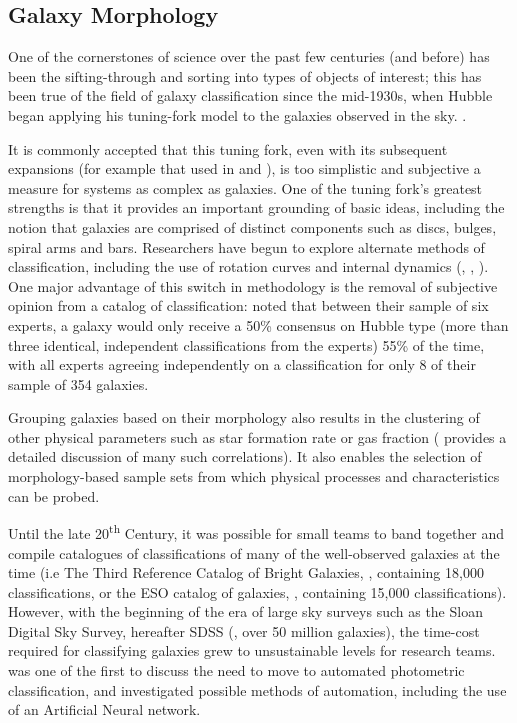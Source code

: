 \documentclass[../main.tex]{subfiles}
\begin{document}
\subsection{Galaxy Morphology}
\label{subsec:galaxy-morphology}
One of the cornerstones of science over the past few centuries (and before) has been the sifting-through and sorting into types of objects of interest; this has been true of the field of galaxy classification since the mid-1930s, when Hubble began applying his tuning-fork model to the galaxies observed in the sky. \citep{Hubble1936}.

It is commonly accepted that this tuning fork, even with its subsequent expansions (for example that used in \citealt{Sandage1961} and \citealt{deVaucouleurs1991}), is too simplistic and subjective a measure for systems as complex as galaxies. One of the tuning fork's greatest strengths is that it provides an important grounding of basic ideas, including the notion that galaxies are comprised of distinct components such as discs, bulges, spiral arms and bars. Researchers have begun to explore alternate methods of classification, including the use of rotation curves and internal dynamics (\citealt{2011MNRAS.413..813C}, \citealt{2017MNRAS.469.2539K}, \citealt{Fall2018:1812.06144v1}). One major advantage of this switch in methodology is the removal of subjective opinion from a catalog of classification: \citet{Naim1995:astro-ph/9502078v1} noted that between their sample of six experts, a galaxy would only receive a 50\% consensus on Hubble type (more than three identical, independent classifications from the experts) 55\% of the time, with all experts agreeing independently on a classification for only 8 of their sample of 354 galaxies.

Grouping galaxies based on their morphology also results in the clustering of other physical parameters such as star formation rate or gas fraction (\citealt{RobertsHaynes1994} provides a detailed discussion of many such correlations). It also enables the selection of morphology-based sample sets from which physical processes and characteristics can be probed. 

Until the late 20\textsuperscript{th} Century, it was possible for small teams to band together and compile catalogues of classifications of many of the well-observed galaxies at the time (i.e The Third Reference Catalog of Bright Galaxies, \citealt{deVaucouleurs1991}, containing 18,000 classifications, or the ESO catalog of galaxies, \citealt{1989Msngr..56...31L}, containing 15,000 classifications). However, with the beginning of the era of large sky surveys such as the Sloan Digital Sky Survey, hereafter SDSS (\citealt{SDSSDR7}, over 50 million galaxies), the time-cost required for classifying galaxies grew to unsustainable levels for research teams. \citet{Naim1995:astro-ph/9502078v1} was one of the first to discuss the need to move to automated photometric classification, and investigated possible methods of automation, including the use of an Artificial Neural network.
\end{document}
